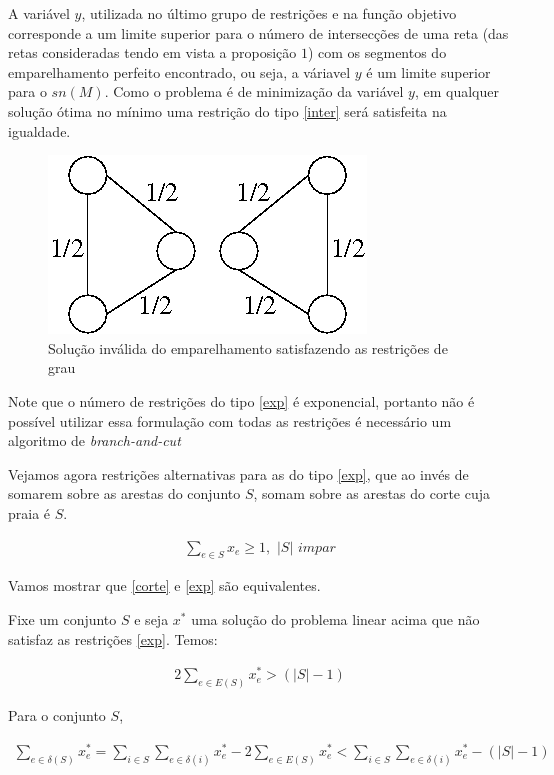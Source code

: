 \documentclass[11pt]{article}
\begin{document}
A variável $y$, utilizada no último grupo de restrições e na função
objetivo corresponde a um limite superior para o número de
intersecções de uma reta (das retas consideradas tendo em vista a
proposição $1$) com os segmentos do emparelhamento perfeito
encontrado, ou seja, a váriavel $y$ é um limite superior para o
$sn(M)$. Como o problema é de minimização da variável $y$, em qualquer
solução ótima no mínimo uma restrição do tipo \eqref{inter} será
satisfeita na igualdade.

\begin{figure}[H]
\centering
\includegraphics[scale=0.50]{ciclos}
\caption{Solução inválida do emparelhamento satisfazendo as restrições
  de grau}
\label{fig:ciclo_impar}
\end{figure}

Note que o número de restrições do tipo \eqref{exp} é exponencial,
portanto não é possível utilizar essa formulação com todas as
restrições é necessário um algoritmo de \emph{branch-and-cut}

Vejamos agora restrições alternativas para as do tipo \eqref{exp}, que
ao invés de somarem sobre as arestas do conjunto $S$, somam sobre as
arestas do corte cuja praia é $S$.

\begin{align}
  \sum_{e \in S}{x_e} \ge 1, \hspace{4pt}|S|\hspace{4pt} impar \label{corte}
\end{align}

Vamos mostrar que \eqref{corte} e \eqref{exp} são equivalentes.

Fixe um conjunto $S$ e seja $x^*$ uma solução do problema linear acima
que não satisfaz as restrições \eqref{exp}. Temos:

\begin{align}
  2\sum_{e \in E(S)}x_e^* > (|S| - 1)
\end{align}

Para o conjunto $S$,

\begin{align}
  \sum_{e \in \delta (S)}x_e^* = \sum_{i \in S}\sum_{e \in \delta
    (i)}x_e^* - 2\sum_{e \in E(S)}x_e^* < \sum_{i \in S}\sum_{e \in
    \delta (i)}x_e^* - (|S| - 1)
\end{align}
\end{document}
